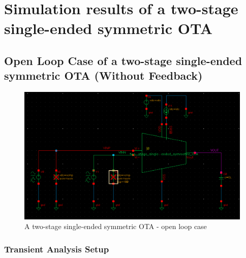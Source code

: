 \chapter{ Simulation results of a two-stage single-ended symmetric OTA}
\label{ch:chap5}


\section{Open Loop Case of a two-stage single-ended symmetric OTA  (Without Feedback)}
    \begin{figure}[h]
        \centering
           \includegraphics[width=1\textwidth]{images/two_stage_ota_open.png}
        \caption{A two-stage single-ended symmetric OTA - open loop case}
        \label{fig: }
    \end{figure}
    

\subsection{Transient Analysis Setup}

